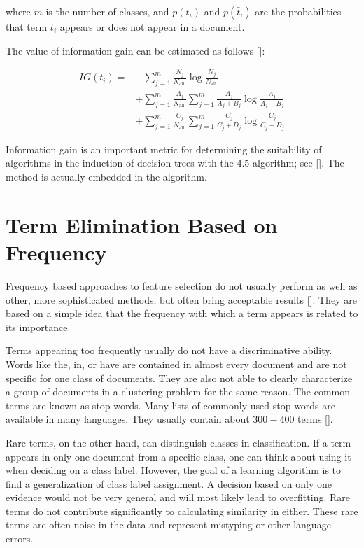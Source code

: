 where $m$ is the number of classes, and $p\left(t_{i}\right)$ and $p\left(\bar{t}_{i}\right)$ are the probabilities that term $t_{i}$ appears or does not appear in a document.

The value of information gain can be estimated as follows [\cite{ref169}]:


\begin{align*}
I G\left(t_{i}\right)= & -\sum_{j=1}^{m} \frac{N_{j}}{N_{\text {all }}} \log \frac{N_{j}}{N_{\text {all }}} \\
& +\sum_{j=1}^{m} \frac{A_{j}}{N_{\text {all }}} \sum_{j=1}^{m} \frac{A_{j}}{A_{j}+B_{j}} \log \frac{A_{j}}{A_{j}+B_{j}}  \tag{14.20}\\
& +\sum_{j=1}^{m} \frac{C_{j}}{N_{\text {all }}} \sum_{j=1}^{m} \frac{C_{j}}{C_{j}+D_{j}} \log \frac{C_{j}}{C_{j}+D_{j}}
\end{align*}


Information gain is an important metric for determining the suitability of algorithms in the induction of decision trees with the 4.5 algorithm; see [\cite{ref7}]. The method is actually embedded in the algorithm.

\section{Term Elimination Based on Frequency}
Frequency based approaches to feature selection do not usually perform as well as other, more sophisticated methods, but often bring acceptable results [\cite{ref175}]. They are based on a simple idea that the frequency with which a term appears is related to its importance.

Terms appearing too frequently usually do not have a discriminative ability. Words like the, in, or have are contained in almost every document and are not specific for one class of documents. They are also not able to clearly characterize a group of documents in a clustering problem for the same reason. The common terms are known as stop words. Many lists of commonly used stop words are available in many languages. They usually contain about $300-400$ terms [\cite{ref7}].

Rare terms, on the other hand, can distinguish classes in classification. If a term appears in only one document from a specific class, one can think about using it when deciding on a class label. However, the goal of a learning algorithm is to find a generalization of class label assignment. A decision based on only one evidence would not be very general and will most likely lead to overfitting. Rare terms do not contribute significantly to calculating similarity in either. These rare terms are often noise in the data and represent mistyping or other language errors.

